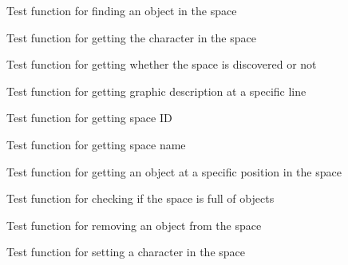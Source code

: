 \begin{DoxyRefList}
%
Test function for finding an object in the space  
\item[Global \doxylink{space__test_8c_a6b5fe5d59fa12f8c676882345450e835}{test1\+\_\+space\+\_\+get\+\_\+character} ()]\label{test__test000215}%
%
Test function for getting the character in the space  
\item[Global \doxylink{space__test_8c_af0942c19d3cf9172286372eacd0d55ae}{test1\+\_\+space\+\_\+get\+\_\+discovered} ()]\label{test__test000195}%
%
Test function for getting whether the space is discovered or not  
\item[Global \doxylink{space__test_8c_a37f7cbe443fa419f4e46cb3aef5b05fb}{test1\+\_\+space\+\_\+get\+\_\+gdesc\+\_\+at} ()]\label{test__test000200}%
%
Test function for getting graphic description at a specific line  
\item[Global \doxylink{space__test_8c_a920df9e02482f4f1e6a5ebcaec523860}{test1\+\_\+space\+\_\+get\+\_\+id} ()]\label{test__test000191}%
%
Test function for getting space ID  
\item[Global \doxylink{space__test_8c_ad12c42523c517507566c5c68b1527689}{test1\+\_\+space\+\_\+get\+\_\+name} ()]\label{test__test000193}%
%
Test function for getting space name  
\item[Global \doxylink{space__test_8c_a7eff795a13a0de52d2f345c69188fa3c}{test1\+\_\+space\+\_\+get\+\_\+object\+\_\+at\+\_\+pos} ()]\label{test__test000209}%
%
Test function for getting an object at a specific position in the space  
\item[Global \doxylink{space__test_8c_a9b23efa95cd3c18574cc8c1ef83ae7a9}{test1\+\_\+space\+\_\+is\+\_\+full} ()]\label{test__test000211}%
%
Test function for checking if the space is full of objects  
\item[Global \doxylink{space__test_8c_a8edeba07aa351da3c1b4bdf4a18c2f7b}{test1\+\_\+space\+\_\+remove\+\_\+object} ()]\label{test__test000204}%
%
Test function for removing an object from the space  
\item[Global \doxylink{space__test_8c_aa1e97468c10eeaf41307bee977142506}{test1\+\_\+space\+\_\+set\+\_\+character} ()]\label{test__test000213}%
%
Test function for setting a character in the space  
\item[Global \doxylink{space__test_8c_ad6cbf13878b26080b6ad3a53571a03db}{test1\+\_\+space\+\_\+set\+\_\+discovered} ()]\label{test__test000189}%

\end{DoxyRefList}
